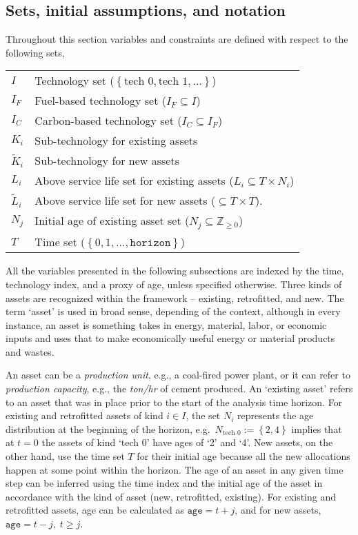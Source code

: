 \documentclass{amsart}
\begin{document}
\subsection{Sets, initial assumptions, and notation}
%
Throughout this section variables and constraints are defined with respect to
the following sets, 

\begin{tabular}{@{}ll@{}}

    $I$	&	Technology set ($\left\lbrace \text{tech 0}, \text{tech 1}, 
    \dots\right\rbrace$)	\\
    $I_F$	&	Fuel-based technology set ($I_F \subseteq I$) \\
    $I_C$	&	Carbon-based technology set ($I_C \subseteq I_F$) \\

    $K_i$	&	Sub-technology for existing assets	\\
    $\tilde{K}_i$	&	Sub-technology for new assets	\\
    $L_i$	&	Above service life set for existing assets 
    ($L_i \subseteq T \times N_i$)	\\
    $\tilde{L}_i$	&	Above service life set for new assets ($\subseteq T 
    \times T$).	\\
    $N_j$	&	Initial age of existing asset set ($N_j \subseteq 
    \mathbb{Z}_{\geq 0}$)	\\    
    $T$	&	Time set ($\left\lbrace 0, 1, \dots, \mathtt{horizon}
    \right\rbrace$)	\\
\end{tabular}
%

\smallskip

All the variables presented in the following subsections are indexed by the
time, technology index, and a proxy of age, unless specified otherwise. 
Three kinds of assets are
recognized within the framework – existing, retrofitted, and new. The term
`asset' is used in broad sense, depending of the context, although in every 
instance, an asset is something takes in energy, material, labor, or economic 
inputs and uses that to make economically useful energy or material products and wastes.

An asset can be a \emph{production unit}, e.g., a coal-fired power plant, or it 
can refer to \emph{production capacity}, e.g., the \emph{ton/hr} of cement produced. 
An `existing asset' refers to an asset that was in place prior to the start of the 
analysis time horizon.
%
For existing and retrofitted assets of kind $i\in I$, the set $N_i$ represents
the age distribution at the beginning of the horizon, e.g.\ $N_{\text{tech 0}}
:= \left\lbrace 2, 4\right\rbrace$ implies that at $t=0$ the assets of kind
`tech 0' have ages of `2' and `4'. New assets, on the other hand, use the
time set $T$ for their initial age because all the new allocations happen at
some point within the horizon. The age of an asset in any given time step can be
inferred using the time index and the initial age of the asset in accordance with 
the kind of asset (new, retrofitted, existing). For existing and retrofitted assets, 
age can be calculated as $\mathtt{age} = t+j$, and for new assets, $\mathtt{age} = t-j,\; t\geq j$.
%
\end{document}
